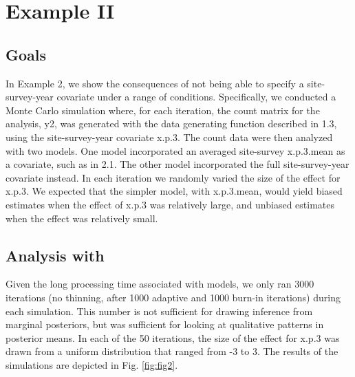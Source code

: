 \documentclass[article]{jss}
\begin{document}
\section[Example II]{Example II}
\subsection[Goals]{Goals}
In Example 2, we show the consequences of not being able to specify a site-survey-year covariate under a range of conditions. Specifically, we conducted a Monte Carlo simulation where, for each iteration, the count matrix for the analysis, y2, was generated with the data generating function described in 1.3, using the site-survey-year covariate x.p.3. The count data were then analyzed with two  models. One model incorporated an averaged site-survey x.p.3.mean as a covariate, such as in 2.1. The other model incorporated the full site-survey-year covariate instead. In each iteration we randomly varied the size of the effect for x.p.3. We expected that the simpler model, with x.p.3.mean, would yield biased estimates when the effect of x.p.3 was relatively large, and unbiased estimates when the effect was relatively small.

\subsection[Analysis with JAGS]{Analysis with }
Given the long processing time associated with  models, we only ran 3000 iterations (no thinning, after 1000 adaptive and 1000 burn-in iterations) during each simulation. This number is not sufficient for drawing inference from marginal posteriors, but was sufficient for looking at qualitative patterns in posterior means. In each of the 50 iterations, the size of the effect for x.p.3 was drawn from a uniform distribution that ranged from -3 to 3. The results of the simulations are depicted in Fig. \ref{fig:fig2}.
\end{document}
